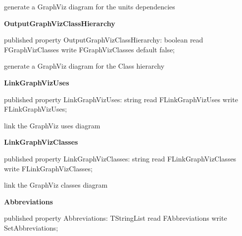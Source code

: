 \documentclass{report}
\newif\ifpdf
\begin{document}
\begin{list}{}
\begin{flushleft}
\ifpdf
\end{flushleft}
\fi


\par generate a GraphViz diagram for the units dependencies\label{PasDoc_Gen.TDocGenerator-OutputGraphVizClassHierarchy}
\item[\textbf{OutputGraphVizClassHierarchy}\hfill]
\ifpdf
\begin{flushleft}
\fi
\begin{ttfamily}
published property OutputGraphVizClassHierarchy: boolean
      read FGraphVizClasses write FGraphVizClasses default false;\end{ttfamily}

\ifpdf
\end{flushleft}
\fi


\par generate a GraphViz diagram for the Class hierarchy\label{PasDoc_Gen.TDocGenerator-LinkGraphVizUses}
\item[\textbf{LinkGraphVizUses}\hfill]
\ifpdf
\begin{flushleft}
\fi
\begin{ttfamily}
published property LinkGraphVizUses: string read FLinkGraphVizUses write FLinkGraphVizUses;\end{ttfamily}

\ifpdf
\end{flushleft}
\fi


\par link the GraphViz uses diagram\label{PasDoc_Gen.TDocGenerator-LinkGraphVizClasses}
\item[\textbf{LinkGraphVizClasses}\hfill]
\ifpdf
\begin{flushleft}
\fi
\begin{ttfamily}
published property LinkGraphVizClasses: string read FLinkGraphVizClasses write FLinkGraphVizClasses;\end{ttfamily}

\ifpdf
\end{flushleft}
\fi


\par link the GraphViz classes diagram\label{PasDoc_Gen.TDocGenerator-Abbreviations}
\item[\textbf{Abbreviations}\hfill]
\ifpdf
\begin{flushleft}
\fi
\begin{ttfamily}
published property Abbreviations: TStringList read FAbbreviations write SetAbbreviations;\end{ttfamily}


\end{flushleft}
\end{list}
\end{document}
